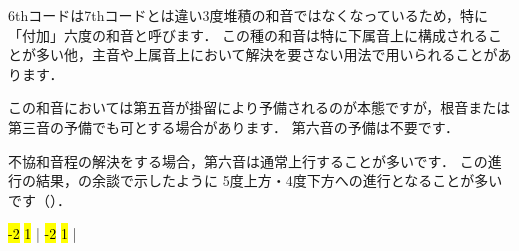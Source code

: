 \documentclass[dvipdfmx,uplatex,b5paper,openany,jbase=12Q,nomag*,textwidth-limit=44%
               ]{gachimuchi}[2020/05/05]
\begin{document}
\begin{floatMusic}[pos=ht]
  \makeatletter\hardspace{.8\Internote}\makeatother
  \znotes{}\en%
  \Notes%
  \sk%
  \en%
  \Notes%
  \en%
  \Notes%
  \sk%
  \en%
  \Notes%
  \en%
  \Notes%
  \sk%
  \en%
  \Notes%
  \en%
  \Notes%
  \sk%
  \en%
  \alaligne%
  \makeatletter\hardspace{-\sign@skip}\makeatother
  \makeatletter\hardspace{.8\Internote}\makeatother
  \znotes{}\en%
  \Notes%
  \en%
  \Notes%
  \en%
  \Notes%
  \sk%
  \en%
  \Notes%
  \en%
  \Notes%
  \sk%
  \en%
  \Notes%
  \sk%
  \en%
  \Notes%
  \sk%
  \en%
  \endpiece%
\end{floatMusic}

6thコードは7thコードとは違い3度堆積の和音ではなくなっているため，特に「付加」六度の和音と呼びます．
この種の和音は特に下属音上に構成されることが多い他，主音や上属音上において解決を要さない用法で用いられることがあります．

この和音においては第五音が掛留により予備されるのが本態ですが，根音または第三音の予備でも可とする場合があります．
第六音の予備は不要です．

不協和音程の解決をする場合，第六音は通常上行することが多いです．
この進行の結果，の余談で示したように
5度上方・4度下方への進行となることが多いです（）．
\begin{floatMusic}[pos=ht,width=0.5\linewidth]
  \nostartrule%
  \generalmeter\meterC
  \Startpiece%
  \NOTes%
  \hl{-2}%
  \en%
  \NOTes%
    \hl{1}%
  \en\bar%
  \NOTEs%
  \en%
  \setdoublebar\changecontext%
  \NOTes%
  \hl{-2}%
  \en%
  \NOTes%
    \hl{1}%
  \en\bar%
  \NOTEs%
  \en\setdoublebar%
  \endpiece{}%
\end{floatMusic}
\end{document}
